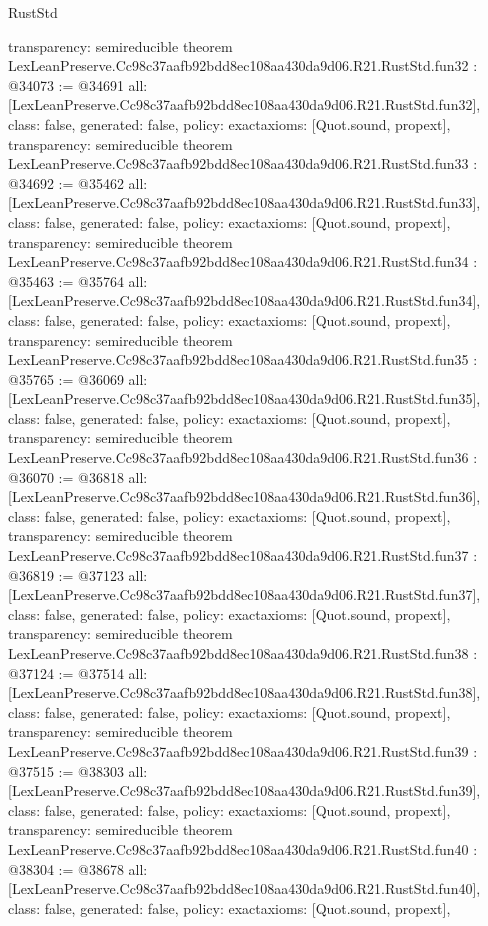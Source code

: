 \begin{lexlean}{RustStd}
\begin{coremodule}
{  transparency: semireducible
}
theorem LexLeanPreserve.Cc98c37aafb92bdd8ec108aa430da9d06.R21.RustStd.fun32 : @34073 := @34691 {
  all: [LexLeanPreserve.Cc98c37aafb92bdd8ec108aa430da9d06.R21.RustStd.fun32],
  class: false,
  generated: false,
  policy: exact{axioms: [Quot.sound, propext]},
  transparency: semireducible
}
theorem LexLeanPreserve.Cc98c37aafb92bdd8ec108aa430da9d06.R21.RustStd.fun33 : @34692 := @35462 {
  all: [LexLeanPreserve.Cc98c37aafb92bdd8ec108aa430da9d06.R21.RustStd.fun33],
  class: false,
  generated: false,
  policy: exact{axioms: [Quot.sound, propext]},
  transparency: semireducible
}
theorem LexLeanPreserve.Cc98c37aafb92bdd8ec108aa430da9d06.R21.RustStd.fun34 : @35463 := @35764 {
  all: [LexLeanPreserve.Cc98c37aafb92bdd8ec108aa430da9d06.R21.RustStd.fun34],
  class: false,
  generated: false,
  policy: exact{axioms: [Quot.sound, propext]},
  transparency: semireducible
}
theorem LexLeanPreserve.Cc98c37aafb92bdd8ec108aa430da9d06.R21.RustStd.fun35 : @35765 := @36069 {
  all: [LexLeanPreserve.Cc98c37aafb92bdd8ec108aa430da9d06.R21.RustStd.fun35],
  class: false,
  generated: false,
  policy: exact{axioms: [Quot.sound, propext]},
  transparency: semireducible
}
theorem LexLeanPreserve.Cc98c37aafb92bdd8ec108aa430da9d06.R21.RustStd.fun36 : @36070 := @36818 {
  all: [LexLeanPreserve.Cc98c37aafb92bdd8ec108aa430da9d06.R21.RustStd.fun36],
  class: false,
  generated: false,
  policy: exact{axioms: [Quot.sound, propext]},
  transparency: semireducible
}
theorem LexLeanPreserve.Cc98c37aafb92bdd8ec108aa430da9d06.R21.RustStd.fun37 : @36819 := @37123 {
  all: [LexLeanPreserve.Cc98c37aafb92bdd8ec108aa430da9d06.R21.RustStd.fun37],
  class: false,
  generated: false,
  policy: exact{axioms: [Quot.sound, propext]},
  transparency: semireducible
}
theorem LexLeanPreserve.Cc98c37aafb92bdd8ec108aa430da9d06.R21.RustStd.fun38 : @37124 := @37514 {
  all: [LexLeanPreserve.Cc98c37aafb92bdd8ec108aa430da9d06.R21.RustStd.fun38],
  class: false,
  generated: false,
  policy: exact{axioms: [Quot.sound, propext]},
  transparency: semireducible
}
theorem LexLeanPreserve.Cc98c37aafb92bdd8ec108aa430da9d06.R21.RustStd.fun39 : @37515 := @38303 {
  all: [LexLeanPreserve.Cc98c37aafb92bdd8ec108aa430da9d06.R21.RustStd.fun39],
  class: false,
  generated: false,
  policy: exact{axioms: [Quot.sound, propext]},
  transparency: semireducible
}
theorem LexLeanPreserve.Cc98c37aafb92bdd8ec108aa430da9d06.R21.RustStd.fun40 : @38304 := @38678 {
  all: [LexLeanPreserve.Cc98c37aafb92bdd8ec108aa430da9d06.R21.RustStd.fun40],
  class: false,
  generated: false,
  policy: exact{axioms: [Quot.sound, propext]},
}
\end{coremodule}
\end{lexlean}
